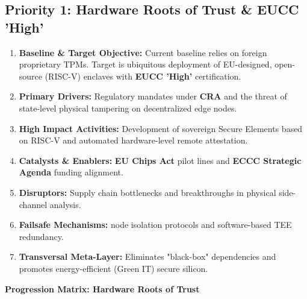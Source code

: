 \documentclass[12pt,a4paper]{article}
\begin{document}
\subsection*{Priority 1: Hardware Roots of Trust \& EUCC 'High'}
\begin{enumerate}
\item \textbf{Baseline \& Target Objective:} Current baseline relies on foreign proprietary TPMs. Target is ubiquitous deployment of EU-designed, open-source (RISC-V) enclaves with \textbf{EUCC 'High'} certification.
\item \textbf{Primary Drivers:} Regulatory mandates under \textbf{CRA} and the threat of state-level physical tampering on decentralized edge nodes.
\item \textbf{High Impact Activities:} Development of sovereign Secure Elements based on RISC-V and automated hardware-level remote attestation.
\item \textbf{Catalysts \& Enablers:} \textbf{EU Chips Act} pilot lines and \textbf{ECCC Strategic Agenda} funding alignment.
\item \textbf{Disruptors:} Supply chain bottlenecks and breakthroughs in physical side-channel analysis.
\item \textbf{Failsafe Mechanisms:} node isolation protocols and software-based TEE redundancy.
\item \textbf{Transversal Meta-Layer:} Eliminates "black-box" dependencies and promotes energy-efficient (Green IT) secure silicon.
\end{enumerate}

\vspace{0.5cm}
\noindent\textbf{Progression Matrix: Hardware Roots of Trust}
\vspace{0.2cm}

\noindent
{}
\end{document}
